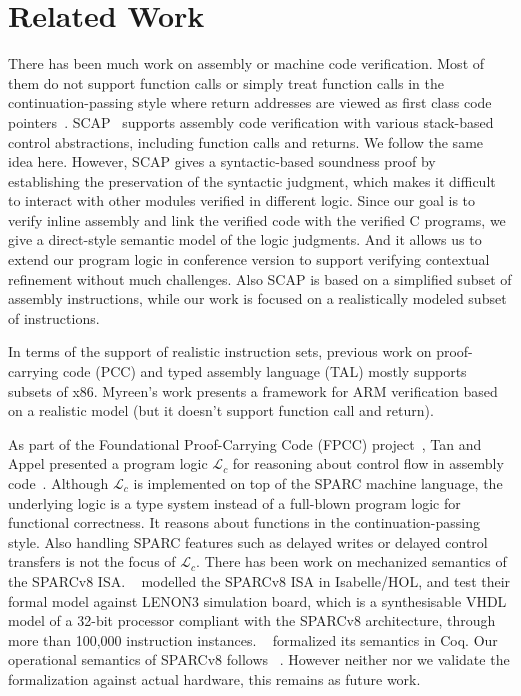 \section{Related Work}
\label{sec:related work}

There has been much work on assembly or
machine code verification. Most of them
do not support function calls or simply
treat function calls in the continuation-passing
style where return addresses are viewed as first
class code pointers~\cite{PCC,FPCC,TAL,TALx86,Yu03ESOP,xcap,cflogic}.
SCAP~\cite{Feng06pldi} supports assembly code verification
with various stack-based control abstractions, including
function calls and returns. We follow the same idea here.
However, SCAP gives a syntactic-based soundness proof
by establishing the preservation of the syntactic judgment,
which makes it difficult to interact with other modules
verified in different logic. Since our goal is to
verify inline assembly and link the verified code
with the verified C programs, we give a direct-style
semantic model of the logic judgments. And it allows us
to extend our program logic in conference version 
to support verifying
contextual refinement without much challenges.
Also SCAP
is based on a simplified subset of assembly instructions,
while our work is focused on a realistically modeled
subset of \sparc{} instructions.

In terms of the support of realistic instruction sets,
previous work on proof-carrying code (PCC) and
typed assembly language (TAL) mostly supports subsets of x86.
Myreen's work \cite{arm-veri} presents a framework for
ARM verification based on a realistic model
(but it doesn't support function call and return).

As part of the Foundational Proof-Carrying Code (FPCC)
project~\cite{FPCC},
Tan and Appel presented a program logic $\mathcal{L}_c$
for reasoning about control flow in assembly code~\cite{cflogic}.
Although $\mathcal{L}_c$ is implemented
on top of the SPARC machine language,
the underlying logic is a type system instead
of a full-blown program logic for functional correctness.
It reasons about functions in the continuation-passing
style. Also
handling SPARC features such as delayed writes or delayed
control transfers is not the focus of $\mathcal{L}_c$.
There has been work on mechanized semantics of the SPARCv8 ISA.
~\cite{sparcv8-formalization-Isabelle} modelled the SPARCv8 ISA
in Isabelle/HOL, and test their formal model against
LENON3 simulation board,
which is a synthesisable VHDL model of a 32-bit processor
compliant with the SPARCv8 architecture,
through more than 100,000 instruction instances.
~\cite{sparc-formalization} formalized its semantics in Coq.
Our operational semantics of SPARCv8 follows ~\cite{sparc-formalization}.
However neither  nor we validate the
formalization against actual hardware, this remains
as future work.

